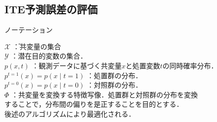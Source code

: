 \documentclass[dvipdfmx]{jreport}
\begin{document}
\subsection{ITE予測誤差の評価}
\begin{itembox}[l]{\large{ノーテーション}}
    \begin{tabbing}
        \hspace{15pt} \raisebox{0.5ex}{\tiny $\bullet$} $ \mathcal{X}$ \hspace{130pt}\=：共変量の集合\\[0.5em]
        \hspace{15pt} \raisebox{0.5ex}{\tiny $\bullet$} $\mathcal{Y}$ \>：潜在目的変数の集合．\\[0.5em]
        \hspace{15pt} \raisebox{0.5ex}{\tiny $\bullet$} $p(x, t)$ \>：観測データに基づく共変量$x$と処置変数$t$の同時確率分布．\\[0.5em]
        \hspace{15pt} \raisebox{0.5ex}{\tiny $\bullet$} $p^{t=1}(x) = p(x \mid t = 1)$ \>：処置群の分布．\\[0.5em]
        \hspace{15pt} \raisebox{0.5ex}{\tiny $\bullet$} $p^{t=0}(x) = p(x \mid t = 0)$ \>：対照群の分布．\\[0.5em]
        \hspace{15pt} \raisebox{0.5ex}{\tiny $\bullet$} $\Phi$ \>：共変量を変換する特徴写像．処置群と対照群の分布を変換\\[0.5em]\>\hspace{6.5pt}することで，分布間の偏りを是正することを目的とする．\\[0.5em]\>\hspace{6.5pt}後述のアルゴリズムにより最適化される．\\[0.5em]

\end{tabbing}
\end{itembox}
\end{document}
